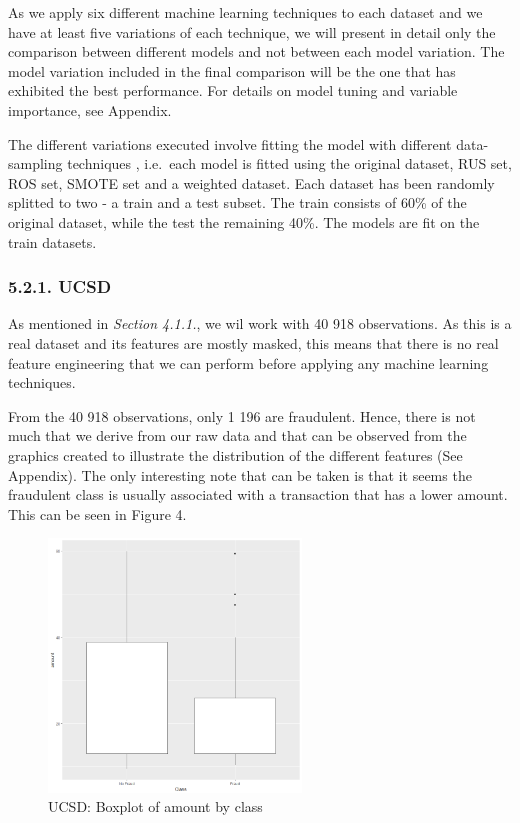\documentclass[12pt,]{article}
\begin{document}
As we apply six different machine learning techniques to each dataset
and we have at least five variations of each technique, we will present
in detail only the comparison between different models and not between
each model variation. The model variation included in the final
comparison will be the one that has exhibited the best performance. For
details on model tuning and variable importance, see Appendix.

The different variations executed involve fitting the model with
different data-sampling techniques , i.e.~each model is fitted using the
original dataset, RUS set, ROS set, SMOTE set and a weighted dataset.
Each dataset has been randomly splitted to two - a train and a test
subset. The train consists of 60\% of the original dataset, while the
test the remaining 40\%. The models are fit on the train datasets.

\hypertarget{ucsd}{%
\subsubsection{5.2.1. UCSD}\label{ucsd}}

As mentioned in \emph{Section 4.1.1.}, we wil work with 40 918
observations. As this is a real dataset and its features are mostly
masked, this means that there is no real feature engineering that we can
perform before applying any machine learning techniques.

From the 40 918 observations, only 1 196 are fraudulent. Hence, there is
not much that we derive from our raw data and that can be observed from
the graphics created to illustrate the distribution of the different
features (See Appendix). The only interesting note that can be taken is
that it seems the fraudulent class is usually associated with a
transaction that has a lower amount. This can be seen in Figure 4.

\begin{figure}
\centering
\includegraphics[width=0.6\textwidth,height=\textheight]{figures/ucsd/descriptive/boxplot_amount.png}
\caption{UCSD: Boxplot of amount by class}
\end{figure}
\end{document}
